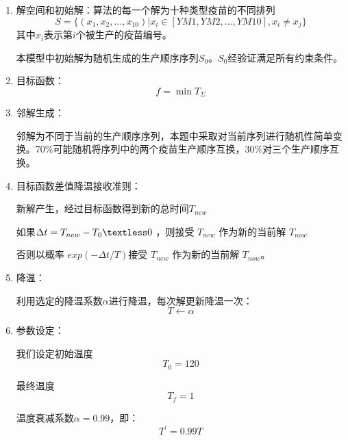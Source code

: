 \documentclass[UTF8]{ctexart}
\begin{document}
	\begin{enumerate}
		\item 解空间和初始解：算法的每一个解为十种类型疫苗的不同排列
		\begin{equation}
		S=\{(x_1,x_2,\dots,x_{10})|x_{i}\in[YM1,YM2,\dots,YM10],x_{i}\neq x_{j}\}
		\end{equation}
		其中$x_{i}$表示第$i$个被生产的疫苗编号。
						
		\qquad 本模型中初始解为随机生成的生产顺序序列$S_{0}$。$S_{0}$经验证满足所有约束条件。

		\item 目标函数：
		\begin{equation*}
		f = \min T_{\Sigma}
		\end{equation*}
		
		\item 邻解生成：
		
		\qquad 邻解为不同于当前的生产顺序序列，本题中采取对当前序列进行随机性简单变换。70\%可能随机将序列中的两个疫苗生产顺序互换，30\%对三个生产顺序互换。
		
		\item 目标函数差值降温接收准则：
		
		\qquad 新解产生，经过目标函数得到新的总时间$ T_{new} $
		
		\qquad 如果$ \Delta t = T_{new} - T_{0}  \textless 0 $ ，则接受 $   T_{new}$ 作为新的当前解 $ T_{now} $
		
		\qquad 否则以概率 $exp \left( -\Delta t/ T\right)$接受 $   T_{new}$ 作为新的当前解 $ T_{now} $。
		
		\item 降温：
		
		\qquad 利用选定的降温系数$\alpha$进行降温，每次解更新降温一次：
		\begin{equation*}
		T \gets \alpha
		\end{equation*}
				
		\item 参数设定：
		
		\qquad 我们设定初始温度
		\begin{equation*}
		T_{0} = 120
		\end{equation*}
		
		\qquad 最终温度
		\begin{equation*}
		T_{f} = 1
		\end{equation*}
		
		\qquad 温度衰减系数$ \alpha = 0.99 $，即：
		\begin{equation*}
		 T^{'} = 0.99 T
		\end{equation*}
			

\end{enumerate}
\end{document}
